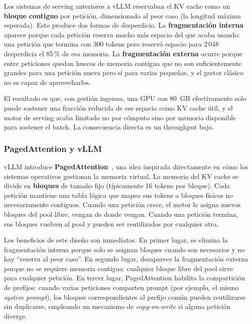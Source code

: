 Los sistemas de serving anteriores a vLLM reservaban el KV cache como un \textbf{bloque contiguo} por petición, dimensionado al peor caso (la longitud máxima esperada). Esto produce dos formas de desperdicio. La \textbf{fragmentación interna} aparece porque cada petición reserva mucho más espacio del que acaba usando: una petición que termina con 300 tokens pero reservó espacio para 2\,048 desperdicia el 85\,\% de esa memoria. La \textbf{fragmentación externa} ocurre porque entre peticiones quedan huecos de memoria contigua que no son suficientemente grandes para una petición nueva pero sí para varias pequeñas, y el gestor clásico no es capaz de aprovecharlos.

El resultado es que, con gestión ingenua, una GPU con 80~GB efectivamente solo puede sostener una fracción reducida de ese espacio como KV cache útil, y el motor de serving acaba limitado no por cómputo sino por memoria disponible para sostener el batch. La consecuencia directa es un throughput bajo.

\subsubsection{PagedAttention y vLLM}

vLLM introduce \textbf{PagedAttention}~\cite{vllm2023}, una idea inspirada directamente en cómo los sistemas operativos gestionan la memoria virtual. La memoria del KV cache se divide en \textbf{bloques} de tamaño fijo (típicamente 16 tokens por bloque). Cada petición mantiene una tabla lógica que mapea sus tokens a bloques físicos no necesariamente contiguos. Cuando una petición crece, el motor le asigna nuevos bloques del pool libre, vengan de donde vengan. Cuando una petición termina, sus bloques vuelven al pool y pueden ser reutilizados por cualquier otra.

Los beneficios de este diseño son inmediatos. En primer lugar, se elimina la fragmentación interna porque solo se asignan bloques cuando son necesarios y no hay ``reserva al peor caso''. En segundo lugar, desaparece la fragmentación externa porque no se requiere memoria contigua: cualquier bloque libre del pool sirve para cualquier petición. En tercer lugar, PagedAttention habilita la compartición de prefijos: cuando varias peticiones comparten prompt (por ejemplo, el mismo \textit{system prompt}), los bloques correspondientes al prefijo común pueden reutilizarse sin duplicarse, empleando un mecanismo de \textit{copy-on-write} si alguna petición diverge.

